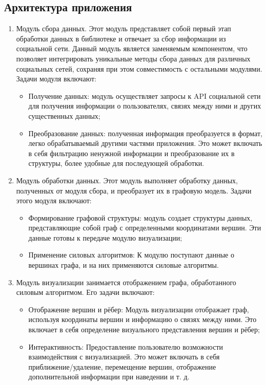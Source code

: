\documentclass[14pt, russian]{scrartcl}
\begin{document}
\subsection{Архитектура приложения}


\begin{enumerate}
	\item{Модуль сбора данных.
	      Этот модуль представляет собой первый этап обработки данных в библиотеке и отвечает за сбор информации из социальной сети. Данный модуль является заменяемым компонентом, что позволяет интегрировать уникальные методы сбора данных для различных социальных сетей, сохраняя при этом совместимость с остальными модулями. Задачи модуля включают:
	      \begin{itemize}
		      \item{Получение данных: модуль осуществляет запросы к API социальной сети для получения информации о пользователях, связях между ними и других существенных данных;}
		      \item{Преобразование данных: полученная информация преобразуется в формат, легко обрабатываемый другими частями приложения. Это может включать в себя фильтрацию ненужной информации            и преобразование их в структуры, более удобные для последующей обработки.}
	      \end{itemize}
	      }
	\item{Модуль обработки данных.
	      Этот модуль выполняет обработку данных, полученных от модуля сбора, и преобразует их в графовую модель. Задачи этого модуля включают:

	      \begin{itemize}
		      \item Формирование графовой структуры: модуль создает структуры данных, представляющие собой граф с определенными координатами вершин. Эти данные готовы к передаче модулю визуализации;
		      \item Применение силовых алгоритмов: К модулю поступают данные о вершинах графа, и на них применяются силовые алгоритмы.
	      \end{itemize}


	      }
	\item{Модуль визуализации занимается отображением графа, обработанного силовым алгоритмом. Его задачи включают:

	      \begin{itemize}
		      \item Отображение вершин и рёбер: Модуль визуализации отображает граф, используя координаты вершин и информацию о связях между ними. Это включает в себя определение визуального представления вершин и рёбер;
		      \item Интерактивность: Предоставление пользователю возможности взаимодействия с визуализацией. Это может включать в себя приближение/удаление, перемещение вершин, отображение дополнительной информации при наведении и т. д.
	      \end{itemize}
	      }

\end{enumerate}
\end{document}

